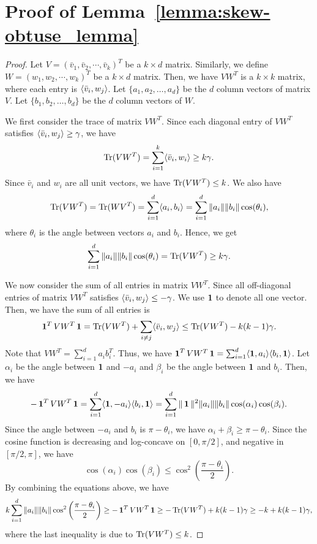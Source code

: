 \section{Proof of Lemma~\ref{lemma:skew-obtuse_lemma}}\label{apx:constructing_skob_family}


\begin{proof}
    Let $V= (\bar{v}_1,\bar{v}_2,\cdots, \bar{v}_k)^T$ be a $k\times d$ matrix. 
    Similarly, we define $W = (w_1,w_2,\cdots, w_k)^T$ be a $k\times d$ matrix. Then, we have $VW^T$ is a $k\times k$ matrix, where each entry is $\langle \bar{v}_i, w_j\rangle$. 
    Let $\{a_1, a_2, \dots, a_d\}$ be the $d$ column vectors of matrix $V$. Let $\{b_1,b_2,\dots, b_d\}$ be the $d$ column vectors of $W$.

    We first consider the trace of matrix $VW^T$. Since each diagonal entry of $VW^T$ satisfies $\langle \bar{v}_i, w_j\rangle \geq \gamma$, we have 
    $$
    \operatorname{Tr}(VW^T) = \sum_{i=1}^k \langle \bar{v}_i, w_i\rangle \geq k \gamma.
    $$
    Since $\bar{v}_i$ and $w_i$ are all unit vectors, we have $\operatorname{Tr}(VW^T) \leq k$.
    We also have 
    $$
    \operatorname{Tr}(VW^T) = \operatorname{Tr}(WV^T) = \sum_{i=1}^d \langle a_i, b_i\rangle = \sum_{i=1}^d \|a_i\|\|b_i\|\cos(\theta_i),
    $$
    where $\theta_i$ is the angle between vectors $a_i$ and $b_i$. Hence, we get
    \begin{equation}\label{eq:trace}
    \sum_{i=1}^d \|a_i\|\|b_i\|\cos(\theta_i) = \operatorname{Tr}(VW^T) \geq k\gamma.
    \end{equation}

    We now consider the sum of all entries in matrix $VW^T$. Since all off-diagonal entries of matrix $VW^T$ satisfies $\langle \bar{v}_i, w_j\rangle \leq -\gamma$. We use $\operatorname{\mathbf{1}}$ to denote all one vector. Then, we have the sum of all entries is
    $$
    \operatorname{\mathbf{1}}^T VW^T \operatorname{\mathbf{1}} = \operatorname{Tr}(VW^T) + \sum_{i\neq j} \langle \bar{v}_i, w_j\rangle \leq \operatorname{Tr}(VW^T) - k(k-1)\gamma.
    $$
    Note that $VW^T = \sum_{i=1}^d a_i b_i^T$. Thus, we have $\operatorname{\mathbf{1}}^T VW^T \operatorname{\mathbf{1}} = \sum_{i=1}^d \langle \operatorname{\mathbf{1}}, a_i\rangle \langle b_i, \operatorname{\mathbf{1}}\rangle$. Let $\alpha_i$ be the angle between $\operatorname{\mathbf{1}}$ and $-a_i$ and $\beta_i$ be the angle between $\operatorname{\mathbf{1}}$ and $b_i$. Then, we have 
    $$
    - \operatorname{\mathbf{1}}^T VW^T \operatorname{\mathbf{1}} = \sum_{i=1}^d \langle \operatorname{\mathbf{1}}, -a_i\rangle \langle b_i, \operatorname{\mathbf{1}}\rangle = \sum_{i=1}^d \|\operatorname{\mathbf{1}}\|^2 \|a_i\|\|b_i\| \cos(\alpha_i) \cos(\beta_i). 
    $$
    Since the angle between $-a_i$ and $b_i$ is $\pi - \theta_i$, we have $\alpha_i + \beta_i \geq \pi - \theta_i$. Since the cosine function is decreasing and log-concave on $[0,\pi/2]$, and negative in $[\pi/2, \pi]$, we have 
    $$
    \cos(\alpha_i) \cos(\beta_i) \leq \cos^2\left(\frac{\pi-\theta_i}{2}\right).
    $$
    By combining the equations above, we have
    \begin{equation}\label{eq:all_sum}
    k \sum_{i=1}^d \|a_i\|\|b_i\| \cos^2\left(\frac{\pi-\theta_i}{2}\right) \geq - \operatorname{\mathbf{1}}^T VW^T \operatorname{\mathbf{1}} \geq - \operatorname{Tr}(VW^T) + k(k-1)\gamma \geq - k + k(k-1)\gamma,
    \end{equation}
    where the last inequality is due to $\operatorname{Tr}(VW^T) \leq k$.


\end{proof}
